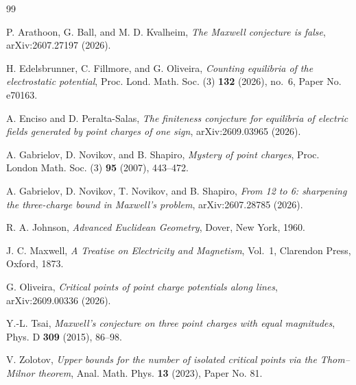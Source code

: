 \documentclass[11pt]{amsart}
\theoremstyle{remark}
\begin{document}
\begin{thebibliography}{99}

 P. Arathoon, G. Ball, and M. D. Kvalheim, \emph{The Maxwell conjecture is false}, arXiv:2607.27197 (2026).

 H. Edelsbrunner, C. Fillmore, and G. Oliveira, \emph{Counting equilibria of the electrostatic potential},
Proc. Lond. Math. Soc. (3) \textbf{132} (2026), no.~6, Paper No. e70163.

 A. Enciso and D. Peralta-Salas, \emph{The finiteness conjecture for equilibria of electric fields generated
by point charges of one sign}, arXiv:2609.03965 (2026).

 A. Gabrielov, D. Novikov, and B. Shapiro, \emph{Mystery of point charges}, Proc. London Math. Soc. (3)
\textbf{95} (2007), 443--472.

 A. Gabrielov, D. Novikov, T. Novikov, and B. Shapiro, \emph{From 12 to 6: sharpening the three-charge
bound in Maxwell's problem}, arXiv:2607.28785 (2026).

 R. A. Johnson, \emph{Advanced Euclidean Geometry}, Dover, New York, 1960.

 J. C. Maxwell, \emph{A Treatise on Electricity and Magnetism}, Vol.~1, Clarendon Press, Oxford, 1873.

 G. Oliveira, \emph{Critical points of point charge potentials along lines}, arXiv:2609.00336 (2026).

 Y.-L. Tsai, \emph{Maxwell's conjecture on three point charges with equal magnitudes}, Phys. D
\textbf{309} (2015), 86--98.

 V. Zolotov, \emph{Upper bounds for the number of isolated critical points via the Thom--Milnor theorem},
Anal. Math. Phys. \textbf{13} (2023), Paper No. 81.

\end{thebibliography}
\end{document}
